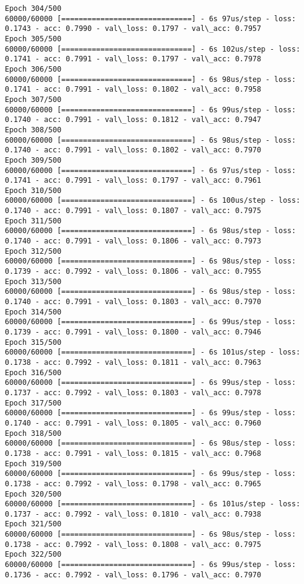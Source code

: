 \documentclass[11pt]{article}
\begin{document}
\begin{Verbatim}[commandchars=\\\{\}]
Epoch 304/500
60000/60000 [==============================] - 6s 97us/step - loss: 0.1743 - acc: 0.7990 - val\_loss: 0.1797 - val\_acc: 0.7957
Epoch 305/500
60000/60000 [==============================] - 6s 102us/step - loss: 0.1741 - acc: 0.7991 - val\_loss: 0.1797 - val\_acc: 0.7978
Epoch 306/500
60000/60000 [==============================] - 6s 98us/step - loss: 0.1741 - acc: 0.7991 - val\_loss: 0.1802 - val\_acc: 0.7958
Epoch 307/500
60000/60000 [==============================] - 6s 99us/step - loss: 0.1740 - acc: 0.7991 - val\_loss: 0.1812 - val\_acc: 0.7947
Epoch 308/500
60000/60000 [==============================] - 6s 98us/step - loss: 0.1740 - acc: 0.7991 - val\_loss: 0.1802 - val\_acc: 0.7970
Epoch 309/500
60000/60000 [==============================] - 6s 97us/step - loss: 0.1741 - acc: 0.7991 - val\_loss: 0.1797 - val\_acc: 0.7961
Epoch 310/500
60000/60000 [==============================] - 6s 100us/step - loss: 0.1740 - acc: 0.7991 - val\_loss: 0.1807 - val\_acc: 0.7975
Epoch 311/500
60000/60000 [==============================] - 6s 98us/step - loss: 0.1740 - acc: 0.7991 - val\_loss: 0.1806 - val\_acc: 0.7973
Epoch 312/500
60000/60000 [==============================] - 6s 98us/step - loss: 0.1739 - acc: 0.7992 - val\_loss: 0.1806 - val\_acc: 0.7955
Epoch 313/500
60000/60000 [==============================] - 6s 98us/step - loss: 0.1740 - acc: 0.7991 - val\_loss: 0.1803 - val\_acc: 0.7970
Epoch 314/500
60000/60000 [==============================] - 6s 99us/step - loss: 0.1739 - acc: 0.7991 - val\_loss: 0.1800 - val\_acc: 0.7946
Epoch 315/500
60000/60000 [==============================] - 6s 101us/step - loss: 0.1738 - acc: 0.7992 - val\_loss: 0.1811 - val\_acc: 0.7963
Epoch 316/500
60000/60000 [==============================] - 6s 99us/step - loss: 0.1737 - acc: 0.7992 - val\_loss: 0.1803 - val\_acc: 0.7978
Epoch 317/500
60000/60000 [==============================] - 6s 99us/step - loss: 0.1740 - acc: 0.7991 - val\_loss: 0.1805 - val\_acc: 0.7960
Epoch 318/500
60000/60000 [==============================] - 6s 98us/step - loss: 0.1738 - acc: 0.7991 - val\_loss: 0.1815 - val\_acc: 0.7968
Epoch 319/500
60000/60000 [==============================] - 6s 99us/step - loss: 0.1738 - acc: 0.7992 - val\_loss: 0.1798 - val\_acc: 0.7965
Epoch 320/500
60000/60000 [==============================] - 6s 101us/step - loss: 0.1737 - acc: 0.7992 - val\_loss: 0.1810 - val\_acc: 0.7938
Epoch 321/500
60000/60000 [==============================] - 6s 98us/step - loss: 0.1738 - acc: 0.7992 - val\_loss: 0.1808 - val\_acc: 0.7975
Epoch 322/500
60000/60000 [==============================] - 6s 99us/step - loss: 0.1736 - acc: 0.7992 - val\_loss: 0.1796 - val\_acc: 0.7970

\end{Verbatim}
\end{document}
